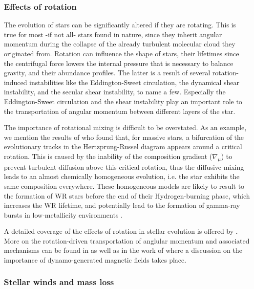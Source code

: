 \documentclass[../../main/thesis_msc.tex]{subfiles}
\begin{document}
						
						
						
						
					\subsubsection{Effects of rotation}
					
						The evolution of stars can be significantly altered if they are rotating. This is true for most -if not all- stars found in nature, since they inherit angular momentum during the collapse of the already turbulent molecular cloud they originated from. Rotation can influence the shape of stars, their lifetimes since the centrifugal force lowers the internal pressure that is necessary to balance gravity, and their abundance profiles. The latter is a result of several rotation-induced instabilities like the Eddington-Sweet circulation, the dynamical shear instability, and the secular shear instability, to name a few. Especially the Eddington-Sweet circulation and the shear instability play an important role to the transportation of angular momentum between different layers of the star. 
						
						The importance of rotational mixing is difficult to be overstated. As an example, we mention the results of \cite{Maeder1987} who found that, for massive stars, a bifurcation of the evolutionary tracks in the Hertzprung-Russel diagram appears around a critical rotation. This is caused by the inability of the composition gradient ($\nabla_{\mu}$) to prevent turbulent diffusion above this critical rotation, thus the diffusive mixing leads to an almost chemically homogeneous evolution, i.e. the star exhibits the same composition everywhere. These homogeneous models are likely to result to the formation of WR stars before the end of their Hydrogen-burning phase, which increases the WR lifetime, and potentially lead to the formation of gamma-ray bursts in low-metallicity environments \citep{Yoon2005}.
						
						A detailed coverage of the effects of rotation in stellar evolution is offered by \cite{Langer1997, Heger2000, Hirschi, Maeder2006, langer12, Palacios}. More on the rotation-driven transportation of anglular momentum and associated mechanisms can be found in \cite{Heger2005, langer12} as well as in the work of \cite{Spruit2002} where a discussion on the importance of dynamo-generated magnetic fields takes place.
						
						
					\subsubsection{Stellar winds and mass loss}
					
\end{document}
